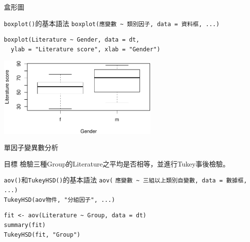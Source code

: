 \documentclass[12pt, aspectratio=43]{beamer}
\begin{document}
\begin{frame}[fragile]{盒形圖}

\begin{block}{\texttt{boxplot()}的基本語法}
\verb+boxplot(應變數 ~ 類別因子, data = 資料框, ...)+
\end{block}

\begin{verbatim}
boxplot(Literature ~ Gender, data = dt, 
  ylab = "Literature score", xlab = "Gender")
\end{verbatim}

\begin{center}
\includegraphics[width=0.6\textwidth]{Rplot-two-group.pdf}
\end{center}
\end{frame}


\begin{frame}[fragile]{單因子變異數分析}
\begin{block}{目標}
檢驗三種Group的Literature之平均是否相等，並進行Tukey事後檢驗。
\end{block}

\begin{block}{\texttt{aov()}和\texttt{TukeyHSD()}的基本語法}
\verb+aov(+
\verb+應變數 ~ 三組以上類別自變數, data = 數據框, ...)+\\
\verb+TukeyHSD(aov物件, "分組因子", ...)+
\end{block}

\begin{verbatim}
fit <- aov(Literature ~ Group, data = dt)
summary(fit)
TukeyHSD(fit, "Group")
\end{verbatim}

\end{frame}
\end{document}
